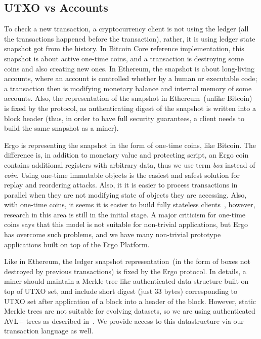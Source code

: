 \subsection{UTXO vs Accounts}
 \label{sec:utxo}


 To check a new transaction, a cryptocurrency client is not using the ledger (all the transactions happened before the
 transaction), rather, it is using ledger state snapshot got from the history. In Bitcoin Core reference implementation,
 this snapshot is about active one-time coins, and a transaction is destroying some coins and also creating new ones.
 In Ethereum, the snapshot is about long-living accounts, where an account is controlled whether by a human or
 executable code; a transaction then is modifying monetary balance and internal memory of some accounts. Also, the
 representation of the snapshot in Ethereum~(unlike Bitcoin) is fixed by the protocol, as authenticating digest of the
 snapshot is written into a block header (thus, in order to have full security guarantees, a client needs to build
 the same snapshot as a miner).

 Ergo is representing the snapshot in the form of one-time coins, like Bitcoin. The difference is, in addition to monetary
 value and protecting script, an Ergo coin contains additional registers with arbitrary data, thus we use term {\em box}
 instead of {\em coin}. Using one-time immutable objects is the easiest and safest solution for replay and reordering
 attacks. Also, it it is easier to process transactions in parallel when they are not modifying state of objects they
 are accessing. Also, with one-time coins, it seems it is easier to build fully stateless clients~\cite{chepurnoy2018edrax},
 however, research in this area is still in the initial stage. A major criticism for one-time coins says that this model
 is not suitable for non-trivial applications, but Ergo has overcome such problems, and we have many non-trivial
 prototype applications built on top of the Ergo Platform.

 Like in Ethereum, the ledger snapshot representation~(in the form of boxes not destroyed by
 previous transactions) is fixed by the Ergo protocol. In details, a miner should maintain a Merkle-tree like
 authenticated data structure built on top of UTXO set, and include short digest (just 33 bytes) corresponding to UTXO
 set after application of a block into a header of the block. However, static Merkle trees are not suitable for evolving
 datasets, so we are using authenticated AVL+ trees as described in~\cite{reyzin2017improving}. We provide access to
 this datastructure via our transaction language as well.


